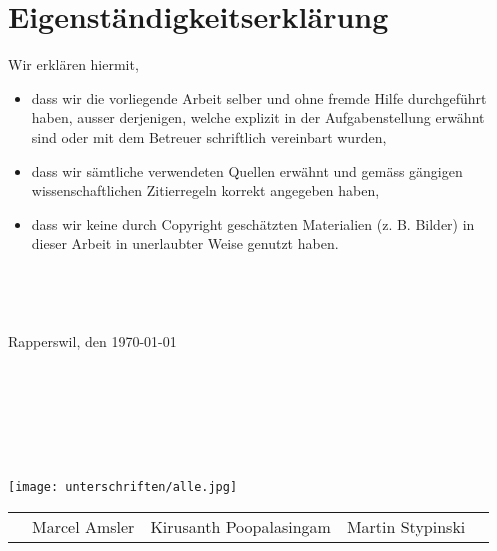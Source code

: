 \cleardoublepage
{}
{}
\chapter*{Eigenständigkeitserklärung}

Wir erklären hiermit,
\begin{itemize}
	\item{dass wir die vorliegende Arbeit selber und ohne fremde Hilfe durchgeführt haben, ausser
derjenigen, welche explizit in der Aufgabenstellung erwähnt sind oder mit dem Betreuer
schriftlich vereinbart wurden,}
	\item{dass wir sämtliche verwendeten Quellen erwähnt und gemäss gängigen wissenschaftlichen
Zitierregeln korrekt angegeben haben,}
	\item{dass wir keine durch Copyright geschätzten Materialien (z. B. Bilder) in dieser Arbeit in
unerlaubter Weise genutzt haben.}
\end{itemize}
\begin{verbatim}




\end{verbatim}
Rapperswil, den \today
\begin{verbatim}







\end{verbatim}
\texttt{[image: unterschriften/alle.jpg]}
\begin{tabular*}{\textwidth}{p{0cm}>{\centering\arraybackslash}m{4.8cm}>{\centering\arraybackslash}m{4.8cm}>{\centering\arraybackslash}m{4.8cm}p{0cm}}
	& Marcel Amsler & Kirusanth Poopalasingam & Martin Stypinski & \\
\end{tabular*}
